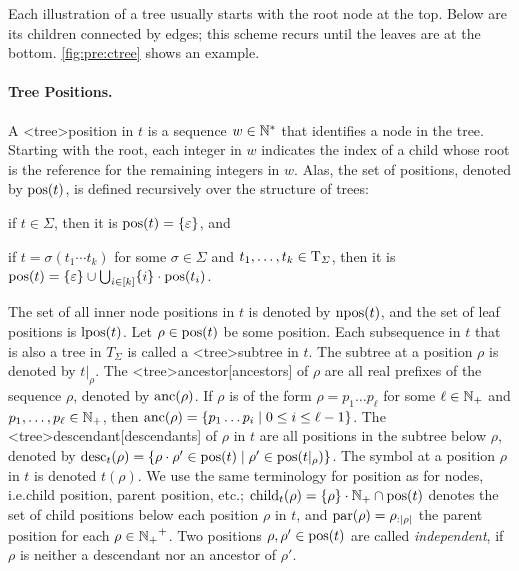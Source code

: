 \documentclass[../document.tex]{subfiles}
\begin{document}
    Each illustration of a tree usually starts with the root node at the top. Below are its children connected by edges; this scheme recurs until the leaves are at the bottom.
    \cref{fig:pre:ctree} shows an example.

    \paragraph{Tree Positions.}
    A <tree>{position} in \(t\) is a sequence $w \in \mathbb{N}^*$ that identifies a node in the tree.
    Starting with the root, each integer in \(w\) indicates the index of a child whose root is the reference for the remaining integers in \(w\).
    Alas, the set of positions, denoted by \(\operatorname{pos}(t)\), is defined recursively over the structure of trees:
    \begin{inparaenum}
        \item if \(t \in \varSigma\), then it is \(\operatorname{pos}(t) = \{\varepsilon\}\), and
        \item if \(t = \sigma(t_1 \cdots t_k)\) for some \(\sigma\in \varSigma\) and \(t_1, \ldots, t_k \in \operatorname{T}_\varSigma\), then it is \(\operatorname{pos}(t) = \{\varepsilon\} \cup \bigcup_{i\in[k]} \{i\}\cdot \operatorname{pos}(t_i)\).
    \end{inparaenum}
    The set of all inner node positions in \(t\) is denoted by \(\operatorname{npos}(t)\), and the set of leaf positions is \(\operatorname{lpos}(t)\).
    Let \(\rho \in \operatorname{pos}(t)\) be some position.
    Each subsequence in \(t\) that is also a tree in \(T_\varSigma\) is called a <tree>{subtree} in \(t\).
    The subtree at a position \(\rho\) is denoted by \(t|_\rho\).
    The <tree>{ancestor}[ancestors] of \(\rho\) are all real prefixes of the sequence \(\rho\), denoted by \(\operatorname{anc}(\rho)\).
    If \(\rho\) is of the form \(\rho = p_1 \ldots p_\ell\) for some \(\ell \in \mathbb{N}_+\) and \(p_1, \ldots, p_\ell \in \mathbb{N}_+\), then \(\operatorname{anc}(\rho) = \{ p_1 \ldots p_i \mid 0 \leq i \leq \ell-1 \}\).
    The <tree>{descendant}[descendants] of \(\rho\) in \(t\) are all positions in the subtree below \(\rho\), denoted by \(\operatorname{desc}_t(\rho) = \{ \rho \cdot \rho' \in \operatorname{pos}(t) \mid \rho' \in \operatorname{pos}(t|_\rho) \}\).
    The symbol at a position \(\rho\) in \(t\) is denoted  \(t(\rho)\).
    We use the same terminology for position as for nodes, i.e.\@ child position, parent position, etc.; \(\operatorname{child}_t(\rho) = \{\rho\} \cdot \mathbb{N}_+ \cap \operatorname{pos}(t)\) denotes the set of child positions below each position \(\rho\) in \(t\), and \(\operatorname{par}(\rho) = \rho_{:|\rho|}\) the parent position for each \(\rho \in {\ensuremath{\mathbb{N}}_+}^+\).
    Two positions \(\rho, \rho' \in \operatorname{pos}(t)\) are called \emph{independent}, if \(\rho\) is neither a descendant nor an ancestor of \(\rho'\).
\end{document}
